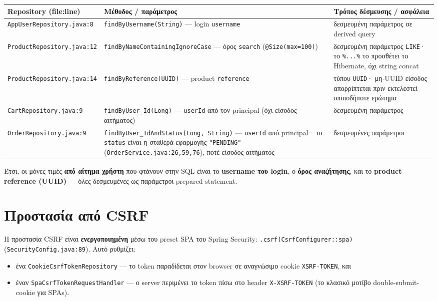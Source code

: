 \documentclass[11pt,a4paper]{article}
\newcommand{\code}[1]{\texttt{#1}}
\begin{document}
\begin{longtable}{@{}>{\raggedright\arraybackslash}p{} >{\raggedright\arraybackslash}p{} >{\raggedright\arraybackslash}p{}@{}}
    \toprule
    \textbf{Repository (file:line)} & \textbf{Μέθοδος / παράμετρος} & \textbf{Τρόπος δέσμευσης / ασφάλεια} \\
    \midrule
    \code{AppUserRepository.\allowbreak{}java:8} & \code{findByUsername(String)} --- login \code{username} & δεσμευμένη παράμετρος σε derived query \\
    \code{ProductRepository.\allowbreak{}java:12} & \code{findBy\allowbreak{}Name\allowbreak{}Containing\allowbreak{}IgnoreCase} --- όρος \code{search} (\code{@Size(max=100)}) & δεσμευμένη παράμετρος \code{LIKE}· το \code{\%...\%} το προσθέτει το Hibernate, όχι string concat \\
    \code{ProductRepository.\allowbreak{}java:14} & \code{findByReference(UUID)} --- product \code{reference} & τύπου \code{UUID}· μη-UUID είσοδος απορρίπτεται πριν εκτελεστεί οποιοδήποτε ερώτημα \\
    \code{CartRepository.\allowbreak{}java:9} & \code{findByUser\_Id(Long)} --- \code{userId} από τον principal (όχι είσοδος αιτήματος) & δεσμευμένη παράμετρος \\
    \code{OrderRepository.\allowbreak{}java:9} & \code{findByUser\_IdAndStatus(Long, String)} --- \code{userId} από principal· το \code{status} είναι η σταθερά εφαρμογής \code{"PENDING"} (\code{OrderService.java:26,59,76}), ποτέ είσοδος αιτήματος & δεσμευμένες παράμετροι \\
    \bottomrule
\end{longtable}

Έτσι, οι μόνες τιμές \textbf{από αίτημα χρήστη} που φτάνουν στην SQL είναι το \textbf{username του
login}, ο \textbf{όρος αναζήτησης}, και το \textbf{product reference (UUID)} --- όλες δεσμευμένες ως
παράμετροι prepared-statement.

\section{Προστασία από CSRF}
\label{sec:csrf}

Η προστασία CSRF είναι \textbf{ενεργοποιημένη} μέσω του preset SPA του Spring Security:
\code{.csrf(\allowbreak{}Csrf\allowbreak{}Configurer::spa)} (\code{SecurityConfig.java:89}). Αυτό ρυθμίζει:
\begin{itemize}[leftmargin=2em]\setlength\itemsep{1pt}
    \item ένα \code{CookieCsrfTokenRepository} --- το token παραδίδεται στον browser σε αναγνώσιμο
          cookie \code{XSRF-TOKEN}, και
    \item έναν \code{SpaCsrfTokenRequestHandler} --- ο server περιμένει το token πίσω στο header
          \code{X-XSRF-TOKEN} (το κλασικό μοτίβο double-submit-cookie για SPAs).
\end{itemize}
\end{document}
